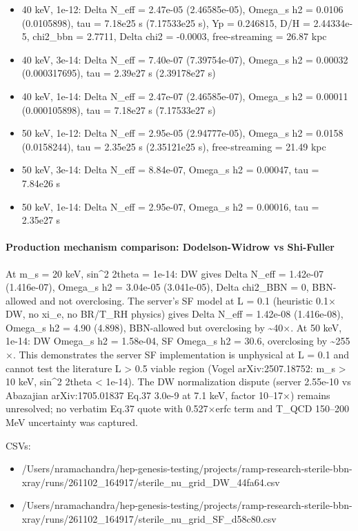 \documentclass[11pt,a4paper]{article}
\begin{document}
\begin{itemize}
  \item 40 keV, 1e-12: Delta N\_eff = 2.47e-05 (2.46585e-05), Omega\_s h2 = 0.0106 (0.0105898), tau = 7.18e25 s (7.17533e25 s), Yp = 0.246815, D/H = 2.44334e-5, chi2\_bbn = 2.7711, Delta chi2 = -0.0003, free-streaming = 26.87 kpc
  \item 40 keV, 3e-14: Delta N\_eff = 7.40e-07 (7.39754e-07), Omega\_s h2 = 0.00032 (0.000317695), tau = 2.39e27 s (2.39178e27 s)
  \item 40 keV, 1e-14: Delta N\_eff = 2.47e-07 (2.46585e-07), Omega\_s h2 = 0.00011 (0.000105898), tau = 7.18e27 s (7.17533e27 s)
  \item 50 keV, 1e-12: Delta N\_eff = 2.95e-05 (2.94777e-05), Omega\_s h2 = 0.0158 (0.0158244), tau = 2.35e25 s (2.35121e25 s), free-streaming = 21.49 kpc
  \item 50 keV, 3e-14: Delta N\_eff = 8.84e-07, Omega\_s h2 = 0.00047, tau = 7.84e26 s
  \item 50 keV, 1e-14: Delta N\_eff = 2.95e-07, Omega\_s h2 = 0.00016, tau = 2.35e27 s
\end{itemize}
\paragraph{Production mechanism comparison: Dodelson-Widrow vs Shi-Fuller}
At m\_s = 20 keV, sin\textasciicircum{}2 2theta = 1e-14: DW gives Delta N\_eff = 1.42e-07 (1.416e-07), Omega\_s h2 = 3.04e-05 (3.041e-05), Delta chi2\_BBN = 0, BBN-allowed and not overclosing. The server's SF model at L = 0.1 (heuristic 0.1$\times$DW, no xi\_e, no BR/T\_RH physics) gives Delta N\_eff = 1.42e-08 (1.416e-08), Omega\_s h2 = 4.90 (4.898), BBN-allowed but overclosing by \textasciitilde{}40$\times$. At 50 keV, 1e-14: DW Omega\_s h2 = 1.58e-04, SF Omega\_s h2 = 30.6, overclosing by \textasciitilde{}255$\times$. This demonstrates the server SF implementation is unphysical at L = 0.1 and cannot test the literature L \textgreater{} 0.5 viable region (Vogel arXiv:2507.18752: m\_s \textgreater{} 10 keV, sin\textasciicircum{}2 2theta \textless{} 1e-14). The DW normalization dispute (server 2.55e-10 vs Abazajian arXiv:1705.01837 Eq.37 3.0e-9 at 7.1 keV, factor 10--17$\times$) remains unresolved; no verbatim Eq.37 quote with 0.527$\times$erfc term and T\_QCD 150--200 MeV uncertainty was captured.

CSVs:

\begin{itemize}
  \item /Users/nramachandra/hep-genesis-testing/projects/ramp-research-sterile-bbn-xray/runs/261102\_164917/sterile\_nu\_grid\_DW\_44fa64.csv
  \item /Users/nramachandra/hep-genesis-testing/projects/ramp-research-sterile-bbn-xray/runs/261102\_164917/sterile\_nu\_grid\_SF\_d58c80.csv
\end{itemize}
\end{document}
